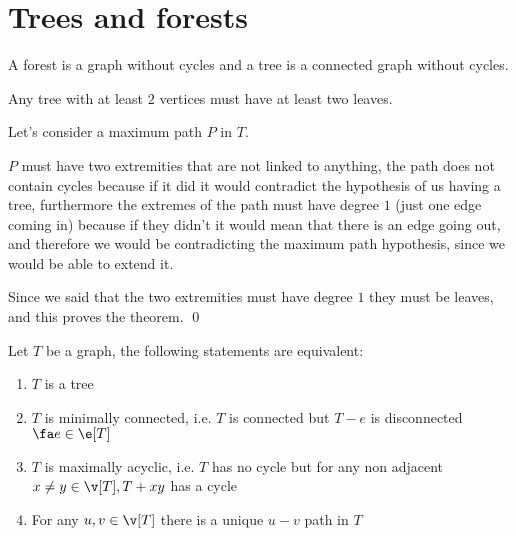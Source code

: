 \section{Trees and forests}
A forest is a graph without cycles and a tree is a connected graph without cycles.
\begin{customlemma}{1.14}
    \label{lemma:1.14}
    Any tree with at least $2$ vertices must have at least two leaves.
\end{customlemma}
\begin{prf}
    Let's consider a maximum path $P$ in $T$.

    $P$ must have two extremities that are not linked to anything, the path does not contain cycles because if it did it would contradict the hypothesis of us having a tree, furthermore the extremes of the path must have degree $1$ (just one edge coming in) because if they didn't it would mean that there is an edge going out, and therefore we would be contradicting the maximum path hypothesis, since we would be able to extend it.

    Since we said that the two extremities must have degree $1$ they must be leaves, and this proves the theorem. \qed
\end{prf}
\begin{customtheorem}{1.15}
    \label{theorem:1.15}
    Let $T$ be a graph, the following statements are equivalent:
    \begin{enumerate}
        \item $T$ is a tree
        \item $T$ is minimally connected, i.e. $T$ is connected but $T - e$ is disconnected $\fa e \in \e[T]$
        \item $T$ is maximally acyclic, i.e. $T$ has no cycle but for any non adjacent $x \neq y \in \v[T], T + xy$ has a cycle
        \item For any $u, v \in \v[T]$ there is a unique $u - v$ path in $T$
    \end{enumerate}
\end{customtheorem}
